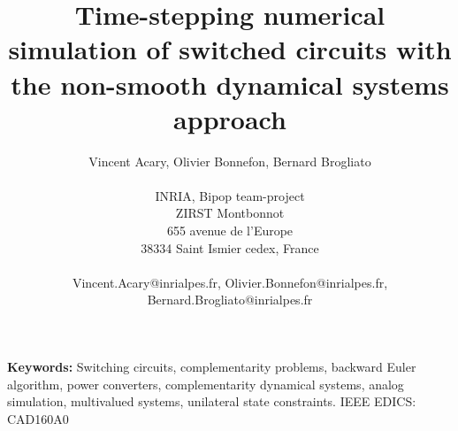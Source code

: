 \documentclass{article}
\begin{document}
\pagestyle{fancy}

\title{Time-stepping numerical simulation of switched circuits with the non-smooth dynamical systems approach} 

\author{Vincent Acary, Olivier Bonnefon, Bernard Brogliato \\ \\ INRIA, Bipop team-project \\ ZIRST Montbonnot \\ 655 avenue de l'Europe
\\ 38334 Saint Ismier cedex, France \\ \\  Vincent.Acary@inrialpes.fr, Olivier.Bonnefon@inrialpes.fr, Bernard.Brogliato@inrialpes.fr}




\maketitle 

\thispagestyle{fancy}


{\bf Keywords:} Switching circuits, complementarity problems, backward Euler algorithm, power converters, complementarity dynamical systems, analog simulation, multivalued systems, unilateral state constraints. IEEE EDICS: CAD160A0


\begin{abstract}

\end{abstract}





\end{document}
